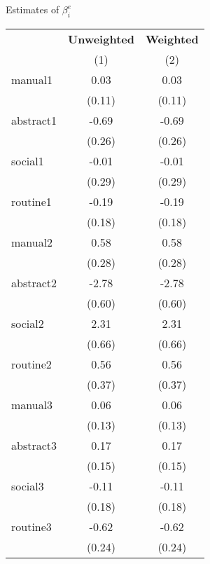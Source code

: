 \begin{center}
\begin{threeparttable}[!h]
\caption{Estimates of $\beta_{i}^e$}
\begin{tabular}{lcc}
\toprule
\toprule
&\multicolumn{1}{c}{\textbf{Unweighted}}&\multicolumn{1}{c}{\textbf{Weighted}} \\
\textbf{}&\multicolumn{1}{c}{(1)}&\multicolumn{1}{c}{(2)} \\
\midrule
manual1             &        0.03&        0.03\\
                    &      (0.11)&      (0.11)\\
abstract1           &       -0.69&       -0.69\\
                    &      (0.26)&      (0.26)\\
social1             &       -0.01&       -0.01\\
                    &      (0.29)&      (0.29)\\
routine1            &       -0.19&       -0.19\\
                    &      (0.18)&      (0.18)\\
manual2             &        0.58&        0.58\\
                    &      (0.28)&      (0.28)\\
abstract2           &       -2.78&       -2.78\\
                    &      (0.60)&      (0.60)\\
social2             &        2.31&        2.31\\
                    &      (0.66)&      (0.66)\\
routine2            &        0.56&        0.56\\
                    &      (0.37)&      (0.37)\\
manual3             &        0.06&        0.06\\
                    &      (0.13)&      (0.13)\\
abstract3           &        0.17&        0.17\\
                    &      (0.15)&      (0.15)\\
social3             &       -0.11&       -0.11\\
                    &      (0.18)&      (0.18)\\
routine3            &       -0.62&       -0.62\\
                    &      (0.24)&      (0.24)\\

\end{tabular}
\end{threeparttable}
\end{center}
